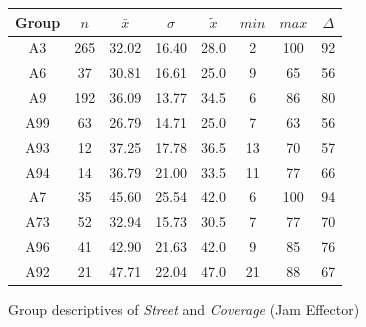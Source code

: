 \begin{figure}[ht!]
	\centering
	\begin{minipage}{0.5\textwidth}
		\tiny
		\setlength{\tabcolsep}{4pt}
		\centering
		\begin{tabular}{c|c|c|c|c|c|c|c}
			\toprule
			Group & $n$ & $\bar{x}$ & $\sigma$ & $\tilde{x}$ & $min$ & $max$ & $\Delta$ \\
			\midrule
			A3   & 265 & 32.02 & 16.40 & 28.0 & 2  & 100 & 92 \\ 
			A6   & 37  & 30.81 & 16.61 & 25.0 & 9  & 65  & 56 \\ 
			A9   & 192 & 36.09 & 13.77 & 34.5 & 6  & 86  & 80 \\ 
			A99  & 63  & 26.79 & 14.71 & 25.0 & 7  & 63  & 56 \\ 
			A93  & 12  & 37.25 & 17.78 & 36.5 & 13 & 70  & 57 \\ 
			A94  & 14  & 36.79 & 21.00 & 33.5 & 11 & 77  & 66 \\ 
			A7   & 35  & 45.60 & 25.54 & 42.0 & 6  & 100 & 94 \\ 
			A73  & 52  & 32.94 & 15.73 & 30.5 & 7  & 77  & 70 \\ 
			A96  & 41  & 42.90 & 21.63 & 42.0 & 9  & 85  & 76 \\ 
			A92  & 21  & 47.71 & 22.04 & 47.0 & 21 & 88  & 67 \\ 
			\bottomrule
		\end{tabular}
		\label{tbl:descriptives_baysis_effector_Street_Cov}
	\end{minipage}%
	\begin{minipage}{0.55\textwidth}
		\tiny
		\centering
		\vfill
		\label{fig:descriptives_baysis_effector_Street_Cov}
	\end{minipage}%
	\caption{Group descriptives of \textit{Street} and \textit{Coverage} (Jam Effector)}
\end{figure}
